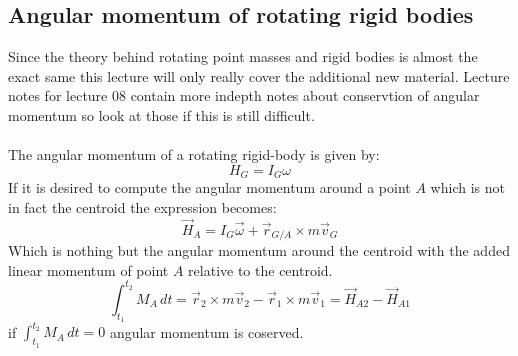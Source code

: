 \documentclass[11pt, a4paper]{article}
\begin{document}
\subsection{Angular momentum of rotating rigid bodies}
Since the theory behind rotating point masses and rigid bodies is almost the exact same this lecture will only really cover the additional new material. Lecture notes for lecture 08 contain more indepth notes about conservtion of angular momentum so look at those if this is still difficult.\\
\\
The angular momentum of a rotating rigid-body is given by:
\begin{equation}
  H_G = I_G\omega
\end{equation}
If it is desired to compute the angular momentum around a point $A$ which is not in fact the centroid the expression becomes:
\begin{equation}
  \vec{H}_A = I_G\vec{\omega} + \vec{r}_{G/A} \times m\vec{v}_G
\end{equation}
Which is nothing but the angular momentum around the centroid with the added linear momentum of point $A$ relative to the centroid.
\begin{equation}
  \int_{t_1}^{t_2} M_A\,dt = \vec{r}_2 \times m\vec{v}_2 - \vec{r}_1 \times m\vec{v}_1 = \vec{H}_{A2} - \vec{H}_{A1} 
\end{equation}
if $\int_{t_1}^{t_2} M_A\,dt = 0$ angular momentum is coserved.
\end{document}

